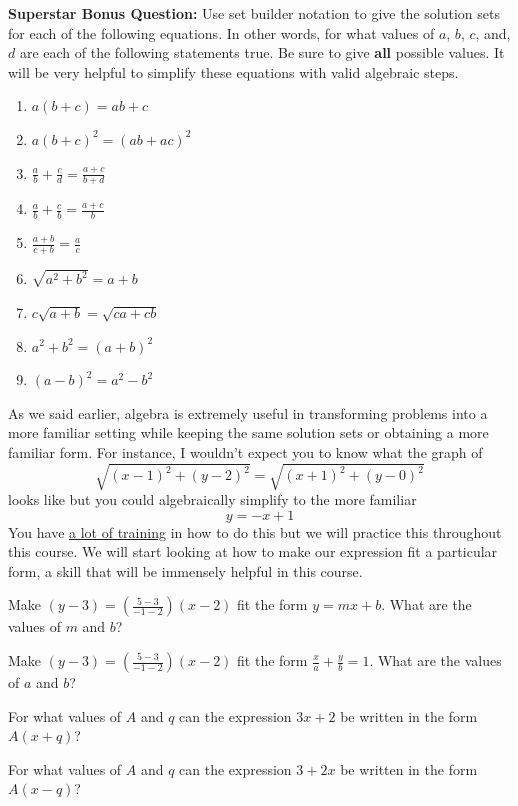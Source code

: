 \textbf{Superstar Bonus Question:} Use set builder notation to give the solution sets for each of the following equations. In other words, for what values of $a$, $b$, $c$, and, $d$ are each of the following statements true. Be sure to give \textbf{all} possible values. It will be very helpful to simplify these equations with valid algebraic steps.
\begin{enumerate}
\item $a(b+c)=ab+c$
\item $a(b+c)^2 =(ab+ac)^2$
\item $\frac{a}{b}+\frac{c}{d} =\frac{a+c}{b+d}$
\item $\frac{a}{b}+\frac{c}{b} =\frac{a+c}{b}$
\item $\frac{a+b}{c+b}=\frac{a}{c}$
\item $\sqrt{a^2+b^2}=a+b$
\item $c \sqrt{a+b}=\sqrt{ca+cb}$
\item $a^2+b^2=(a+b)^2$
\item $(a-b)^2=a^2-b^2$
\end{enumerate}


\begin{info}
As we said earlier, algebra is extremely useful in transforming problems into a more familiar setting while keeping the same solution sets or obtaining a more familiar form. For instance, I wouldn't expect you to know what the graph of $$\sqrt{(x-1)^2+(y-2)^2}=\sqrt{(x+1)^2+(y-0)^2}$$ looks like but you could algebraically simplify to the more familiar $$y=-x+1$$
You have \underline{a lot of training} in how to do this but we will practice this throughout this course. We will start looking at how to make our expression fit a particular form, a skill that will be immensely helpful in this course.
\end{info}

\bq \be
\item Make $(y-3)=\left( \frac{5-3}{-1-2} \right) (x-2)$ fit the form $y=mx+b$. What are the values of $m$ and $b$?
\item Make $(y-3)=\left( \frac{5-3}{-1-2} \right) (x-2)$ fit the form $\frac{x}{a} +\frac{y}{b} =1$. What are the values of $a$ and $b$?
\ee \eq

\bq \be
\item For what values of $A$ and $q$ can the expression $3x+2$ be written in the form $A(x+q)$?
\item For what values of $A$ and $q$ can the expression $3+2x$ be written in the form $A(x-q)$?
\ee \eq

